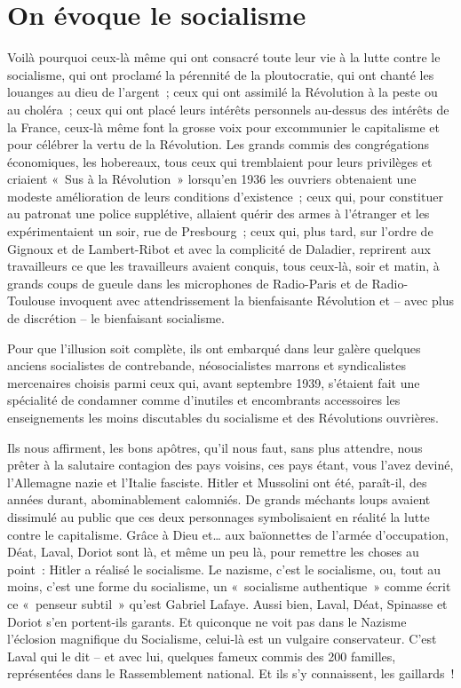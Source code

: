 \documentclass[french,twoside]{book} %
\begin{document}
\section[On évoque le socialisme]{On évoque le socialisme}
\noindent Voilà pourquoi ceux-là même qui ont consacré toute leur vie à la lutte contre le socialisme, qui ont proclamé la pérennité de la ploutocratie, qui ont chanté les louanges au dieu de l’argent ; ceux qui ont assimilé la Révolution à la peste ou au choléra ; ceux qui ont placé leurs intérêts personnels au-dessus des intérêts de la France, ceux-là même font la grosse voix pour excommunier le capitalisme et pour célébrer la vertu de la Révolution. Les grands commis des congrégations économiques, les hobereaux, tous ceux qui tremblaient pour leurs privilèges et criaient « Sus à la Révolution » lorsqu’en 1936 les ouvriers obtenaient une modeste amélioration de leurs conditions d’existence ; ceux qui, pour constituer au patronat une police supplétive, allaient quérir des armes à l’étranger et les expérimentaient un soir, rue de Presbourg ; ceux qui, plus tard, sur l’ordre de Gignoux et de Lambert-Ribot et avec la complicité de Daladier, reprirent aux travailleurs ce que les travailleurs avaient conquis, tous ceux-là, soir et matin, à grands coups de gueule dans les microphones de Radio-Paris et de Radio-Toulouse invoquent avec attendrissement la bienfaisante Révolution et – avec plus de discrétion – le bienfaisant socialisme.\par
Pour que l’illusion soit complète, ils ont embarqué dans leur galère quelques anciens socialistes de contrebande, néosocialistes marrons et syndicalistes mercenaires choisis parmi ceux qui, avant septembre 1939, s’étaient fait une spécialité de condamner comme d’inutiles et encombrants accessoires les enseignements les moins discutables du socialisme et des Révolutions ouvrières.\par
Ils nous affirment, les bons apôtres, qu’il nous faut, sans plus attendre, nous prêter à la salutaire contagion des pays voisins, ces pays étant, vous l’avez deviné, l’Allemagne nazie et l’Italie fasciste. Hitler et Mussolini ont été, paraît-il, des années durant, abominablement calomniés. De grands méchants loups avaient dissimulé au public que ces deux personnages symbolisaient en réalité la lutte contre le capitalisme. Grâce à Dieu et… aux baïonnettes de l’armée d’occupation, Déat, Laval, Doriot sont là, et même un peu là, pour remettre les choses au point : Hitler a réalisé le socialisme. Le nazisme, c’est le socialisme, ou, tout au moins, c’est une forme du socialisme, un « socialisme authentique » comme écrit ce « penseur subtil » qu’est Gabriel Lafaye. Aussi bien, Laval, Déat, Spinasse et Doriot s’en portent-ils garants. Et quiconque ne voit pas dans le Nazisme l’éclosion magnifique du Socialisme, celui-là est un vulgaire conservateur. C’est Laval qui le dit – et avec lui, quelques fameux commis des 200 familles, représentées dans le Rassemblement national. Et ils s’y connaissent, les gaillards !
\end{document}
